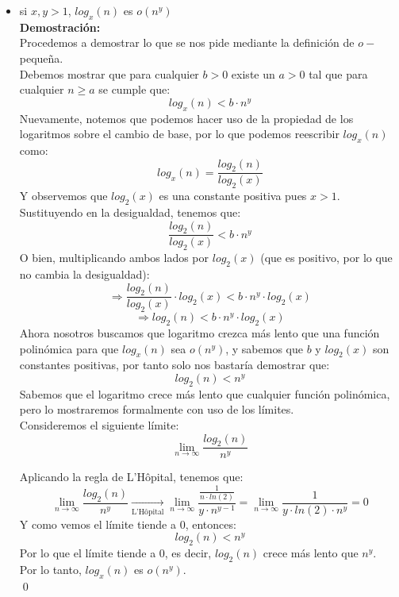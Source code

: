 \documentclass[12pt]{article}
\begin{document}
\begin{itemize}
\begin{itemize}
            \item si $x, y > 1$, $log_x(n)$ es $o(n^y)$\\
            \textbf{Demostración:}\\
            Procedemos a demostrar lo que se nos pide mediante la definición de $o-$pequeña.\\
            Debemos mostrar que para cualquier $b > 0$ existe un $a > 0$ tal que para cualquier $n \geq a$ se cumple que:
            \[
            log_x(n) < b \cdot n^y
            \]
            Nuevamente, notemos que podemos hacer uso de la propiedad de los logaritmos sobre el cambio de base, por lo que podemos reescribir $log_x(n)$ como:
            \[
            log_x(n) = \frac{log_2(n)}{log_2(x)}
            \]
            Y observemos que $log_2(x)$ es una constante positiva pues $x > 1$.\\
            Sustituyendo en la desigualdad, tenemos que:
            \[
            \frac{log_2(n)}{log_2(x)} < b \cdot n^y
            \]
            O bien, multiplicando ambos lados por $log_2(x)$ (que es positivo, por lo que no cambia la desigualdad):
            \[
            \Rightarrow \frac{log_2(n)}{log_2(x)} \cdot log_2(x) < b \cdot n^y \cdot log_2(x)
            \]
            \[
            \Rightarrow log_2(n) < b \cdot n^y \cdot log_2(x)
            \]
            Ahora nosotros buscamos que logaritmo crezca más lento que una función polinómica para que $log_x(n)$ sea $o(n^y)$, y sabemos que $b$ y $log_2(x)$ son constantes positivas, por tanto solo nos bastaría demostrar que:
            \[
            log_2(n) < n^y
            \]
            Sabemos que el logaritmo crece más lento que cualquier función polinómica, pero lo mostraremos formalmente con uso de los límites.\\
            Consideremos el siguiente límite:
            \[
            \lim_{n \to \infty} \frac{log_2(n)}{n^y}
            \]

            Aplicando la regla de L'Hôpital, tenemos que:
            \[
            \lim_{n \to \infty} \frac{log_2(n)}
            {n^y} \xrightarrow[\text{L'Hôpital}]{} \lim_{n \to \infty} \frac{\frac{1}{n \cdot ln(2)}}{y \cdot n^{y-1}} = \lim_{n \to \infty} \frac{1}{y \cdot ln(2) \cdot n^y} = 0
            \]
            Y como vemos el límite tiende a 0, entonces:
            \[
            log_2(n) < n^y
            \]
            Por lo que el límite tiende a 0, es decir, $log_2(n)$ crece más lento que $n^y$.\\
            Por lo tanto, $log_x(n)$ es $o(n^y)$.\\
            \qed




\end{itemize}
\end{itemize}
\end{document}
